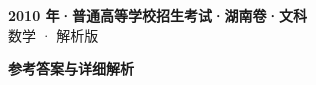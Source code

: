 \documentclass[zihao=-4, a4paper]{ctexart}
\begin{document}
\begin{center}
  {\Large\bfseries 2010 年·普通高等学校招生考试·湖南卷·文科}\\[4pt]
  {\large 数学 · 解析版}
\end{center}
\medskip
{}

\clearpage
{}
\begin{center}{\Large\bfseries 参考答案与详细解析}\end{center}
\medskip

\end{document}
